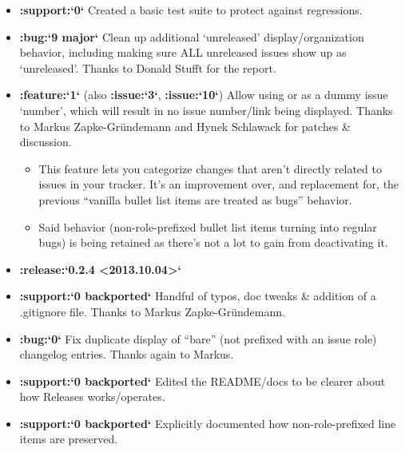 \documentclass[letterpaper,10pt,english]{sphinxmanual}
\begin{document}
\begin{itemize}
\item {} 
{\color{red}\bfseries{}:support:{}`0{}`} Created a basic test suite to protect against regressions.

\item {} 
{\color{red}\bfseries{}:bug:{}`9 major{}`} Clean up additional ‘unreleased’ display/organization
behavior, including making sure ALL unreleased issues show up as
‘unreleased’. Thanks to Donald Stufft for the report.

\item {} 
{\color{red}\bfseries{}:feature:{}`1{}`} (also {\color{red}\bfseries{}:issue:{}`3{}`}, {\color{red}\bfseries{}:issue:{}`10{}`}) Allow using \sphinxcode{\sphinxupquote{-}} or  as a
dummy issue ‘number’, which will result in no issue number/link being
displayed.  Thanks to Markus Zapke-Gründemann and Hynek Schlawack for patches
\& discussion.
\begin{itemize}
\item {} 
This feature lets you categorize changes that aren’t directly related
to issues in your tracker. It’s an improvement over, and replacement
for, the previous “vanilla bullet list items are treated as bugs”
behavior.

\item {} 
Said behavior (non-role-prefixed bullet list items turning into
regular bugs) is being retained as there’s not a lot to gain from
deactivating it.

\end{itemize}

\item {} 
{\color{red}\bfseries{}:release:{}`0.2.4 \textless{}2013.10.04\textgreater{}{}`}

\item {} 
{\color{red}\bfseries{}:support:{}`0 backported{}`} Handful of typos, doc tweaks \& addition of a
.gitignore file.  Thanks to Markus Zapke-Gründemann.

\item {} 
{\color{red}\bfseries{}:bug:{}`0{}`} Fix duplicate display of “bare” (not prefixed with an issue role)
changelog entries. Thanks again to Markus.

\item {} 
{\color{red}\bfseries{}:support:{}`0 backported{}`} Edited the README/docs to be clearer about how
Releases works/operates.

\item {} 
{\color{red}\bfseries{}:support:{}`0 backported{}`} Explicitly documented how non-role-prefixed line
items are preserved.


\end{itemize}
\end{document}
